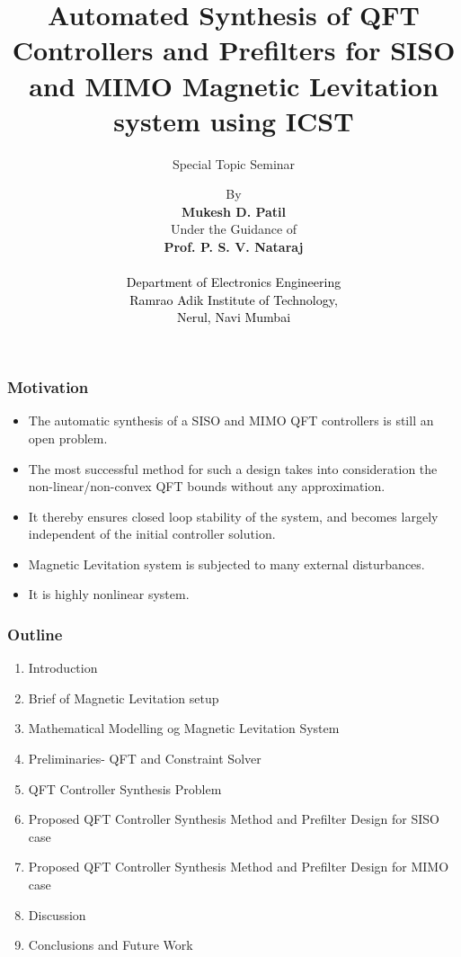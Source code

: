 \documentclass{beamer}
\title{Automated Synthesis of QFT Controllers and Prefilters for SISO and MIMO Magnetic Levitation system using ICST }
\subtitle{Special Topic Seminar}
\begin{document}
\author[SysCon] {By \\ \vspace{0.05in} \textbf{Mukesh D. Patil } \\ \vspace{0.01in} {Under the Guidance of} \\ \textbf{Prof. P. S. V. Nataraj }\\
\textcolor{black}{ \\ Department of Electronics Engineering} \\ \textcolor{black}{Ramrao Adik Institute of Technology,\\ Nerul, Navi Mumbai } \\
}

\begin{frame}
\begin{center}
\end{center}
\titlepage
\end{frame}

\begin{frame}
\frametitle{Motivation}
\begin{itemize}
\item {The automatic synthesis of a SISO and MIMO QFT controllers is still
an open problem.}
\item {The most successful method for such a design takes
into consideration the non-linear/non-convex QFT bounds without any
approximation.}
\item {It thereby ensures closed loop stability of the
system, and becomes largely independent of the initial controller
solution.}
\item {Magnetic Levitation system is subjected to many external
disturbances.}
\item {It is highly nonlinear system.}
\end{itemize}
\end{frame}


\begin{frame}
\frametitle{Outline}
\begin{enumerate}
\item {Introduction}
\item {Brief of Magnetic Levitation setup}
\item {Mathematical Modelling og Magnetic Levitation System}
\item {Preliminaries- QFT and Constraint Solver}
\item {QFT Controller Synthesis Problem}
\item {Proposed QFT Controller Synthesis Method and Prefilter Design  for SISO case}
\item {Proposed QFT Controller Synthesis Method and Prefilter Design  for MIMO case}
\item {Discussion}
\item {Conclusions and Future Work}
\end{enumerate}
\end{frame}
\end{document}
